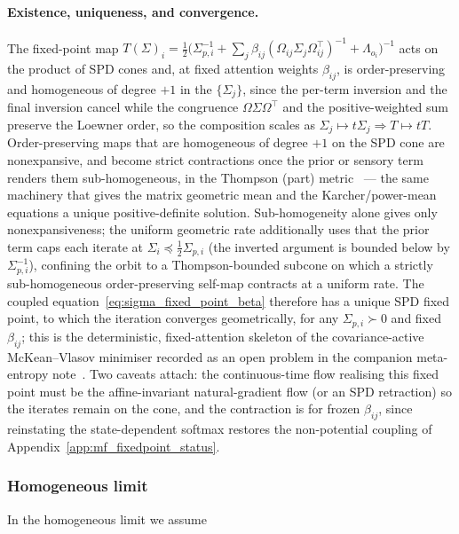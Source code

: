 \documentclass[11pt]{article}
\begin{document}
\paragraph{Existence, uniqueness, and convergence.} The fixed-point map $T(\Sigma)_i = \tfrac{1}{2}\big(\Sigma_{p,i}^{-1} + \sum_j \beta_{ij}(\Omega_{ij}\Sigma_j\Omega_{ij}^\top)^{-1} + \Lambda_{o_i}\big)^{-1}$ acts on the product of SPD cones and, at fixed attention weights $\beta_{ij}$, is order-preserving and homogeneous of degree $+1$ in the $\{\Sigma_j\}$, since the per-term inversion and the final inversion cancel while the congruence $\Omega\Sigma\Omega^\top$ and the positive-weighted sum preserve the Loewner order, so the composition scales as $\Sigma_j \mapsto t\Sigma_j \Rightarrow T \mapsto tT$. Order-preserving maps that are homogeneous of degree $+1$ on the SPD cone are nonexpansive, and become strict contractions once the prior or sensory term renders them sub-homogeneous, in the Thompson (part) metric~\cite{nussbaum1988hilbert, lawson2001geometric} — the same machinery that gives the matrix geometric mean and the Karcher/power-mean equations a unique positive-definite solution. Sub-homogeneity alone gives only nonexpansiveness; the uniform geometric rate additionally uses that the prior term caps each iterate at $\Sigma_i \preceq \tfrac12\Sigma_{p,i}$ (the inverted argument is bounded below by $\Sigma_{p,i}^{-1}$), confining the orbit to a Thompson-bounded subcone on which a strictly sub-homogeneous order-preserving self-map contracts at a uniform rate. The coupled equation~\eqref{eq:sigma_fixed_point_beta} therefore has a unique SPD fixed point, to which the iteration converges geometrically, for any $\Sigma_{p,i} \succ 0$ and fixed $\beta_{ij}$; this is the deterministic, fixed-attention skeleton of the covariance-active McKean--Vlasov minimiser recorded as an open problem in the companion meta-entropy note~\cite{Dennis2026metaentropy}. Two caveats attach: the continuous-time flow realising this fixed point must be the affine-invariant natural-gradient flow (or an SPD retraction) so the iterates remain on the cone, and the contraction is for frozen $\beta_{ij}$, since reinstating the state-dependent softmax restores the non-potential coupling of Appendix~\ref{app:mf_fixedpoint_status}.

\subsubsection{Homogeneous limit}

In the homogeneous limit we assume
\end{document}
